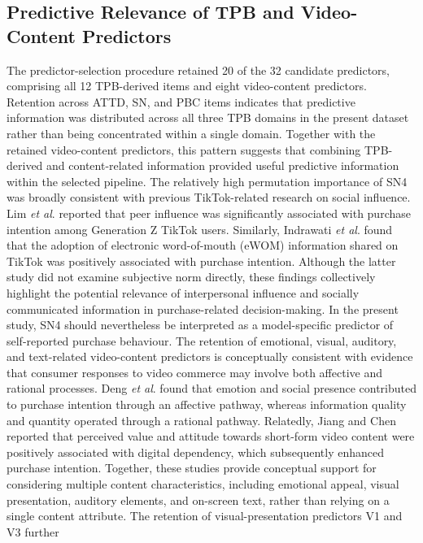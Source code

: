 \documentclass[jtaer,article,submit,moreauthors]{Definitions/mdpi}
\begin{document}
\subsection{Predictive Relevance of TPB and Video-Content Predictors}

The predictor-selection procedure retained 20 of the 32 candidate
predictors, comprising all 12 TPB-derived items and eight video-content
predictors. Retention across ATTD, SN, and PBC items indicates that
predictive information was distributed across all three TPB domains in
the present dataset rather than being concentrated within a single
domain. Together with the retained video-content predictors, this
pattern suggests that combining TPB-derived and content-related
information provided useful predictive information within the selected
pipeline.
The relatively high permutation importance of SN4 was broadly
consistent with previous TikTok-related research on social influence.
Lim \textit{et al}. \cite{Lim2025} reported that peer influence was
significantly associated with purchase intention among Generation Z
TikTok users. Similarly, Indrawati \textit{et al}.
\cite{Indrawati2023} found that the adoption of electronic word-of-mouth
(eWOM) information shared on TikTok was positively associated with
purchase intention. Although the latter study did not examine
subjective norm directly, these findings collectively highlight the
potential relevance of interpersonal influence and socially
communicated information in purchase-related decision-making. In the
present study, SN4 should nevertheless be interpreted as a
model-specific predictor of self-reported purchase behaviour.
The retention of emotional, visual, auditory, and text-related
video-content predictors is conceptually consistent with evidence that
consumer responses to video commerce may involve both affective and
rational processes. Deng \textit{et al}. \cite{Deng2024} found that
emotion and social presence contributed to purchase intention through
an affective pathway, whereas information quality and quantity operated
through a rational pathway. Relatedly, Jiang and Chen
\cite{Jiang2025} reported that perceived value and attitude towards
short-form video content were positively associated with digital
dependency, which subsequently enhanced purchase intention. Together,
these studies provide conceptual support for considering multiple
content characteristics, including emotional appeal, visual
presentation, auditory elements, and on-screen text, rather than
relying on a single content attribute.
The retention of visual-presentation predictors V1 and V3 further
\end{document}
